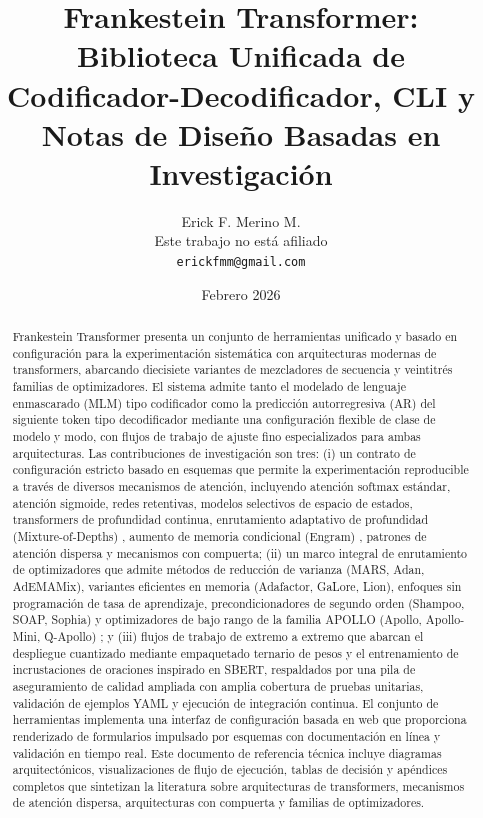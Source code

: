 \documentclass[11pt,a4paper]{article}
\title{Frankestein Transformer:\\Biblioteca Unificada de Codificador-Decodificador, CLI y Notas de Diseño Basadas en Investigación}
\author{
Erick F. Merino M. \\
Este trabajo no está afiliado \\
\texttt{erickfmm@gmail.com}
}
\date{Febrero 2026}
\begin{document}
\maketitle

\begin{abstract}
Frankestein Transformer presenta un conjunto de herramientas unificado y basado en configuración para la experimentación sistemática con arquitecturas modernas de transformers, abarcando diecisiete variantes de mezcladores de secuencia y veintitrés familias de optimizadores. El sistema admite tanto el modelado de lenguaje enmascarado (MLM) tipo codificador como la predicción autorregresiva (AR) del siguiente token tipo decodificador mediante una configuración flexible de clase de modelo y modo, con flujos de trabajo de ajuste fino especializados para ambas arquitecturas. Las contribuciones de investigación son tres: (i) un contrato de configuración estricto basado en esquemas que permite la experimentación reproducible a través de diversos mecanismos de atención, incluyendo atención softmax estándar, atención sigmoide, redes retentivas, modelos selectivos de espacio de estados, transformers de profundidad continua, enrutamiento adaptativo de profundidad (Mixture-of-Depths) \citep{zhu2026mixtureofdepthsattention}, aumento de memoria condicional (Engram) \citep{cheng2026conditionalmemoryscalablelookup}, patrones de atención dispersa y mecanismos con compuerta; (ii) un marco integral de enrutamiento de optimizadores que admite métodos de reducción de varianza (MARS, Adan, AdEMAMix), variantes eficientes en memoria (Adafactor, GaLore, Lion), enfoques sin programación de tasa de aprendizaje, precondicionadores de segundo orden (Shampoo, SOAP, Sophia) y optimizadores de bajo rango de la familia APOLLO (Apollo, Apollo-Mini, Q-Apollo) \citep{zhu2025apollosgdlikememoryadamwlevel}; y (iii) flujos de trabajo de extremo a extremo que abarcan el despliegue cuantizado mediante empaquetado ternario de pesos y el entrenamiento de incrustaciones de oraciones inspirado en SBERT, respaldados por una pila de aseguramiento de calidad ampliada con amplia cobertura de pruebas unitarias, validación de ejemplos YAML y ejecución de integración continua. El conjunto de herramientas implementa una interfaz de configuración basada en web que proporciona renderizado de formularios impulsado por esquemas con documentación en línea y validación en tiempo real. Este documento de referencia técnica incluye diagramas arquitectónicos, visualizaciones de flujo de ejecución, tablas de decisión y apéndices completos que sintetizan la literatura sobre arquitecturas de transformers, mecanismos de atención dispersa, arquitecturas con compuerta y familias de optimizadores.
\end{abstract}
\end{document}
